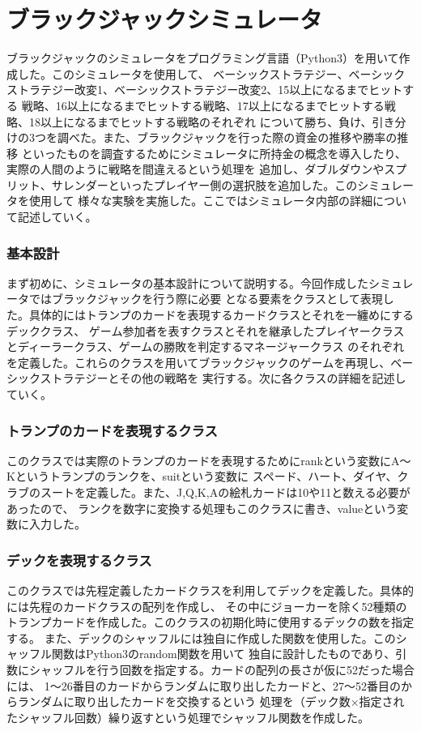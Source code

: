 \section{ブラックジャックシミュレータ}
ブラックジャックのシミュレータをプログラミング言語（Python3）を用いて作成した。このシミュレータを使用して、
ベーシックストラテジー、ベーシックストラテジー改変1、ベーシックストラテジー改変2、15以上になるまでヒットする
戦略、16以上になるまでヒットする戦略、17以上になるまでヒットする戦略、18以上になるまでヒットする戦略のそれぞれ
について勝ち、負け、引き分けの3つを調べた。また、ブラックジャックを行った際の資金の推移や勝率の推移
といったものを調査するためにシミュレータに所持金の概念を導入したり、実際の人間のように戦略を間違えるという処理を
追加し、ダブルダウンやスプリット、サレンダーといったプレイヤー側の選択肢を追加した。このシミュレータを使用して
様々な実験を実施した。ここではシミュレータ内部の詳細について記述していく。

\subsubsection{基本設計}
まず初めに、シミュレータの基本設計について説明する。今回作成したシミュレータではブラックジャックを行う際に必要
となる要素をクラスとして表現した。具体的にはトランプのカードを表現するカードクラスとそれを一纏めにするデッククラス、
ゲーム参加者を表すクラスとそれを継承したプレイヤークラスとディーラークラス、ゲームの勝敗を判定するマネージャークラス
のそれぞれを定義した。これらのクラスを用いてブラックジャックのゲームを再現し、ベーシックストラテジーとその他の戦略を
実行する。次に各クラスの詳細を記述していく。

\subsubsection{トランプのカードを表現するクラス}
このクラスでは実際のトランプのカードを表現するためにrankという変数にA～Kというトランプのランクを、suitという変数に
スペード、ハート、ダイヤ、クラブのスートを定義した。また、J,Q,K,Aの絵札カードは10や11と数える必要があったので、
ランクを数字に変換する処理もこのクラスに書き、valueという変数に入力した。

\subsubsection{デックを表現するクラス}
このクラスでは先程定義したカードクラスを利用してデックを定義した。具体的には先程のカードクラスの配列を作成し、
その中にジョーカーを除く52種類のトランプカードを作成した。このクラスの初期化時に使用するデックの数を指定する。
また、デックのシャッフルには独自に作成した関数を使用した。このシャッフル関数はPython3のrandom関数を用いて
独自に設計したものであり、引数にシャッフルを行う回数を指定する。カードの配列の長さが仮に52だった場合には、
1～26番目のカードからランダムに取り出したカードと、27～52番目のからランダムに取り出したカードを交換するという
処理を（デック数×指定されたシャッフル回数）繰り返すという処理でシャッフル関数を作成した。

